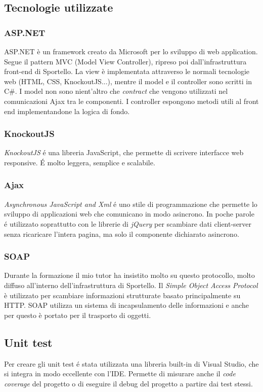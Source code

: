 \subsection{Tecnologie utilizzate}

\subsubsection{ASP.NET}
ASP.NET è un framework creato da Microsoft per lo sviluppo di web application. Segue il pattern MVC (Model View Controller), ripreso poi dall'infrastruttura front-end di Sportello. La view è implementata attraverso le normali tecnologie web (HTML, CSS, KnockoutJS...), mentre il model e il controller sono scritti in C\#. I model non sono nient'altro che \textit{contract} che vengono utilizzati nel comunicazioni Ajax tra le componenti. I controller espongono metodi utili al front end implementandone la logica di fondo.  

\subsubsection{KnockoutJS}

\textit{KnockoutJS} é una libreria JavaScript, che permette di scrivere interfacce web responsive. É molto leggera, semplice e scalabile. 

\subsubsection{Ajax}
\textit{Asynchronous JavaScript and Xml} é uno stile di programmazione che permette lo sviluppo di applicazioni web che comunicano in modo asincrono. In poche parole é utilizzato soprattutto con le librerie di \textit{jQuery} per scambiare dati client-server senza ricaricare l'intera pagina, ma solo il componente dichiarato asincrono.

\subsubsection{SOAP}
Durante la formazione il mio tutor ha insistito molto su questo protocollo, molto diffuso all'interno dell'infrastruttura di Sportello. Il \textit{Simple Object Access Protocol} è utilizzato per scambiare informazioni strutturate basato principalmente su HTTP. SOAP utilizza un sistema di incapsulamento delle informazioni e anche per questo è portato per il trasporto di oggetti.

\subsection{Unit test}
Per creare gli unit test é stata utilizzata una libreria built-in di Visual Studio, che si integra in modo eccellente con l'IDE. Permette di misurare anche il \textit{code coverage} del progetto o di eseguire il debug del progetto a partire dai test stessi.

